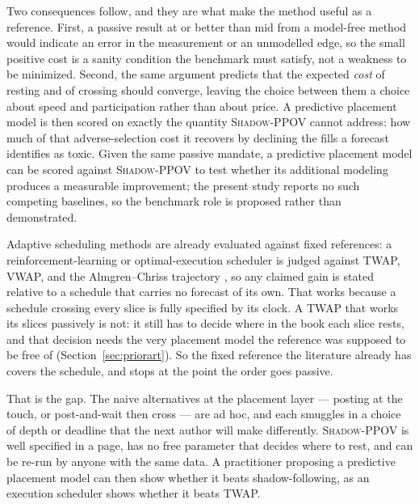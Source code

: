 \documentclass[11pt]{article}
\newcommand{\pov}{\textsc{Shadow-PPOV}}
\begin{document}
Two consequences follow, and they are what make the method useful as a
reference. First, a passive result at or better than mid from a model-free
method would indicate an error in the measurement or an unmodelled edge, so the
small positive cost is a sanity condition the benchmark must satisfy, not a
weakness to be minimized. Second, the same argument predicts that the expected
\emph{cost} of resting and of crossing should converge, leaving the choice
between them a choice about speed and participation rather than about price. A
predictive placement model is then scored on exactly the quantity \pov{} cannot
address: how much of that adverse-selection cost it recovers by declining the
fills a forecast identifies as toxic. Given the
same passive mandate, a predictive placement model can be scored against
\pov{} to test whether its additional modeling produces a measurable
improvement; the present study reports no such competing baselines, so the
benchmark role is proposed rather than demonstrated.

Adaptive scheduling methods are already evaluated against fixed references: a
reinforcement-learning or optimal-execution scheduler is judged against TWAP,
VWAP, and the Almgren--Chriss trajectory \cite{almgren2000,queuereactive2025},
so any claimed gain is stated relative to a schedule that carries no forecast of
its own. That works because a schedule crossing every slice is fully specified
by its clock. A TWAP that works its slices passively is not: it still has to
decide where in the book each slice rests, and that decision needs the very
placement model the reference was supposed to be free of
(Section~\ref{sec:priorart}). So the fixed reference the literature already has
covers the schedule, and stops at the point the order goes passive.

That is the gap. The naive alternatives at the placement layer --- posting at
the touch, or post-and-wait then cross
\cite{contkukanov2015,limitmarkettactics2014} --- are ad hoc, and each smuggles
in a choice of depth or deadline that the next author will make differently.
\pov{} is well specified in a page, has no free parameter that decides where to
rest, and can be re-run by anyone with the same data. A practitioner proposing a
predictive placement model can then show whether it beats shadow-following, as
an execution scheduler shows whether it beats TWAP.
\end{document}
